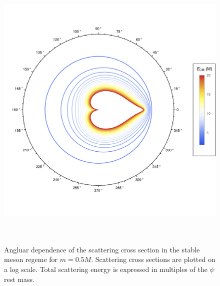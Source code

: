 \documentclass{article}
\begin{document}
\begin{figure}
\begin{center}
\vspace*{-2cm}
\includegraphics[width=14cm, height=14cm]{StableMeson-LowEnergy-Polar}
\caption{Angluar dependence of the scattering cross section in the stable meson regeme for $m = 0.5 M$. Scattering cross sections are plotted on a log scale. Total scattering energy is expressed in multiples of the $\psi$ rest mass.} 
\label{stable-angular}
\end{center}
\end{figure}
\end{document}
